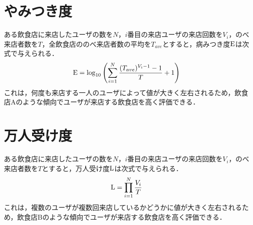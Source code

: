 \section{やみつき度}

ある飲食店に来店したユーザの数を$N$，$i$番目の来店ユーザの来店回数を$V_i$，のべ来店者数を$T$，全飲食店ののべ来店者数の平均を$T_{ave}$とすると，病みつき度$\rm E$は次式で与えられる．
\begin{equation}
	{\rm E} = \log_{10}{\left(\sum^{N}_{i=1} \frac{(T_{ave})^{V_i-1}-1}{T}+1\right)}
\end{equation}
これは，何度も来店する一人のユーザによって値が大きく左右されるため，飲食店Aのような傾向でユーザが来店する飲食店を高く評価できる．

\section{万人受け度}
ある飲食店に来店したユーザの数を$N$，$i$番目の来店ユーザの来店回数を$V_i$，のべ来店者数を$T$とすると，万人受け度$\rm L$は次式で与えられる．
\begin{equation}
	{\rm L} = \prod^N_{i=1}\frac{V_i}{T}
\end{equation}
これは，複数のユーザが複数回来店しているかどうかに値が大きく左右されるため，飲食店Bのような傾向でユーザが来店する飲食店を高く評価できる．

